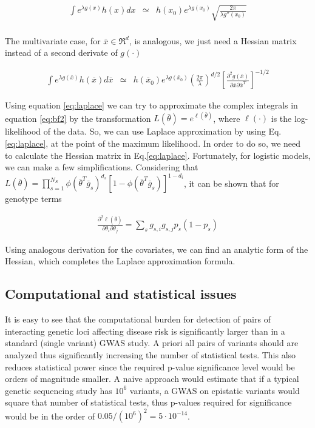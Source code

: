 \begin{eqnarray*}
	\int{e^{\lambda g(x)} h(x) dx} & \simeq & h(x_0) e^{\lambda g(x_0)} \sqrt{\frac{2 \pi}{\lambda g''(x_0)}} \\
\end{eqnarray*}

The multivariate case, for $\bar{x} \in \Re^d$, is analogous, we just need a Hessian matrix instead of a second derivate of $g(\cdot)$

\begin{eqnarray}\label{eq:laplace}
	\int{e^{\lambda g(\bar{x})} h(\bar{x}) d\bar{x}} & \simeq & h(\bar{x}_0) e^{\lambda g(\bar{x}_0)} 
	\left( \frac{2 \pi}{\lambda} \right)^{d/2} \left[ \frac{\partial^2 g(\bar{x}) }{\partial \bar{x} \partial \bar{x}^T} \right] ^{-1/2}
\end{eqnarray}

Using equation \ref{eq:laplace} we can try to approximate the complex integrals in equation \ref{eq:bf2} by the transformation $L(\bar{\theta}) = e^{\ell(\bar{\theta})}$, where $\ell(\cdot)$ is the log-likelihood of the data. So, we can use Laplace approximation by using Eq.\ref{eq:laplace}, at the point of the maximum likelihood. In order to do so, we need to calculate the Hessian matrix in Eq.\ref{eq:laplace}. Fortunately, for logistic models, we can make a few simplifications. Considering that $L(\bar{\theta}) = \prod_{s=1}^{N_S}{ \phi( \bar{\theta}^T \bar{g}_s)^{d_s} [ 1-\phi( \bar{\theta}^T \bar{g}_s) ]^{1-d_i} }$, it can be shown that for genotype terms

\begin{eqnarray*}
	\frac{ \partial^2 \ell(\bar{\theta}) }{ \partial\theta_i \partial\theta_j } 
	= \sum_s{ g_{s,i} g_{s,j} p_s (1-p_s) } 
\end{eqnarray*}

Using analogous derivation for the covariates, we can find an analytic form of the Hessian, which completes the Laplace approximation formula.

\subsection{Computational and statistical issues}

It is easy to see that the computational burden for detection of pairs of interacting genetic loci affecting disease risk is significantly larger than in a standard (single variant) GWAS study. A priori all pairs of variants should are analyzed thus significantly increasing the number of statistical tests. This also reduces statistical power since the required p-value significance level would be orders of magnitude smaller. A naive approach would estimate that if a typical genetic sequencing study has $10^6$ variants, a GWAS on epistatic variants would square that number of statistical tests, thus p-values required for significance would be in the order of $0.05 / (10^6)^2 = 5 \cdot 10^{-14}$. 

